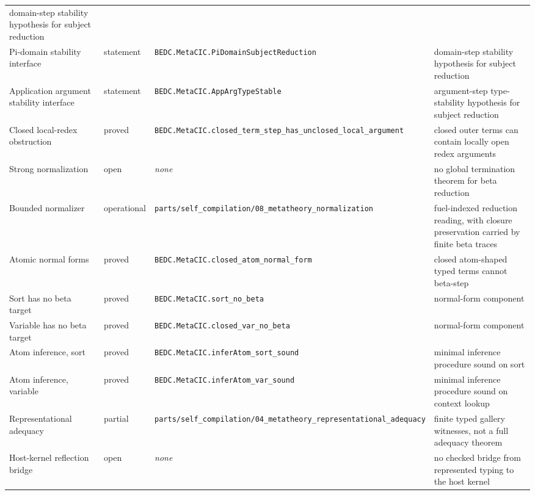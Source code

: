 \begin{longtable}{p{}p{}p{}p{}}
domain-step stability hypothesis for subject reduction\\
Pi-domain stability interface &
statement &
\texttt{BEDC.MetaCIC.PiDomainSubjectReduction} &
domain-step stability hypothesis for subject reduction\\
Application argument stability interface &
statement &
\texttt{BEDC.MetaCIC.AppArgTypeStable} &
argument-step type-stability hypothesis for subject reduction\\
Closed local-redex obstruction &
proved &
\texttt{BEDC.MetaCIC.closed\_term\_step\_has\_unclosed\_local\_argument} &
closed outer terms can contain locally open redex arguments\\
Strong normalization &
open &
\textit{none} &
no global termination theorem for beta reduction\\
Bounded normalizer &
operational &
\texttt{parts/self\_compilation/08\_metatheory\_normalization} &
fuel-indexed reduction reading, with closure preservation carried by finite beta traces\\
Atomic normal forms &
proved &
\texttt{BEDC.MetaCIC.closed\_atom\_normal\_form} &
closed atom-shaped typed terms cannot beta-step\\
Sort has no beta target &
proved &
\texttt{BEDC.MetaCIC.sort\_no\_beta} &
normal-form component\\
Variable has no beta target &
proved &
\texttt{BEDC.MetaCIC.closed\_var\_no\_beta} &
normal-form component\\
Atom inference, sort &
proved &
\texttt{BEDC.MetaCIC.inferAtom\_sort\_sound} &
minimal inference procedure sound on sort\\
Atom inference, variable &
proved &
\texttt{BEDC.MetaCIC.inferAtom\_var\_sound} &
minimal inference procedure sound on context lookup\\
Representational adequacy &
partial &
\texttt{parts/self\_compilation/04\_metatheory\_representational\_adequacy} &
finite typed gallery witnesses, not a full adequacy theorem\\
Host-kernel reflection bridge &
open &
\textit{none} &
no checked bridge from represented typing to the host kernel\\
\bottomrule
\end{longtable}


